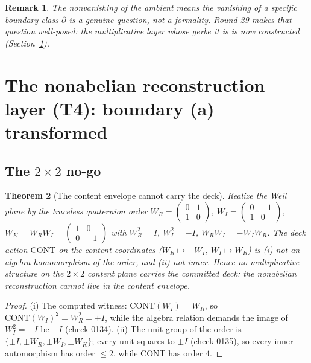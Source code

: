 \documentclass[11pt]{article}
\newtheorem{theorem}{Theorem}
\newtheorem{remark}[theorem]{Remark}
\begin{document}
\begin{remark}
The nonvanishing of the ambient means the vanishing of a
\emph{specific} boundary class $\partial$ is a genuine question, not a
formality. Round 29 makes that question well-posed: the multiplicative
layer whose gerbe it is is now constructed (Section~\ref{sec:nonabel}).
\end{remark}

\section{The nonabelian reconstruction layer (T4): boundary (a)
transformed}\label{sec:nonabel}

\subsection{The $2\times2$ no-go}

\begin{theorem}[The content envelope cannot carry the deck]\label{th:nogo}
Realize the Weil plane by the traceless quaternion order
$W_R=\left(\begin{smallmatrix}0&1\\1&0\end{smallmatrix}\right)$,
$W_I=\left(\begin{smallmatrix}0&-1\\1&0\end{smallmatrix}\right)$,
$W_K=W_RW_I=\left(\begin{smallmatrix}1&0\\0&-1\end{smallmatrix}\right)$
with $W_R^2=I$, $W_I^2=-I$, $W_RW_I=-W_IW_R$. The deck action
$\mathrm{CONT}$ on the content coordinates ($W_R\mapsto-W_I$,
$W_I\mapsto W_R$) is (i) not an algebra homomorphism of the order, and
(ii) not inner. Hence no multiplicative structure \emph{on the
$2\times2$ content plane} carries the committed deck: the nonabelian
reconstruction cannot live in the content envelope.
\end{theorem}

\begin{proof}
(i) The computed witness: $\mathrm{CONT}(W_I)=W_R$, so
$\mathrm{CONT}(W_I)^2=W_R^2=+I$, while the algebra relation demands the
image of $W_I^2=-I$ be $-I$ (check 0134). (ii) The unit group of the
order is $\{\pm I,\pm W_R,\pm W_I,\pm W_K\}$; every unit squares to
$\pm I$ (check 0135), so every inner automorphism has order $\le2$,
while $\mathrm{CONT}$ has order $4$.
\end{proof}
\end{document}
